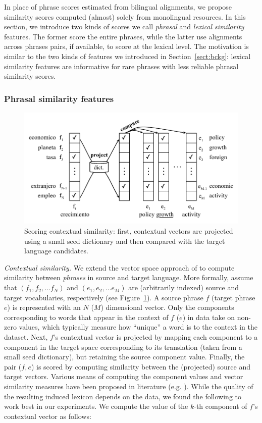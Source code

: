 \documentclass[11pt]{article}
\newcommand{\secref}[1]{Section~\ref{#1}}
\newcommand{\figref}[1]{Figure~\ref{#1}}
\begin{document}
In place of phrase scores estimated from bilingual alignments, we propose similarity scores computed (almost) solely from monolingual resources.  In this section, we introduce two kinds of scores we call {\em phrasal} and {\em lexical similarity} features.  The former score the entire phrases, while the latter use alignments across phrases pairs, if available, to score at the lexical level.  The motivation is similar to the two kinds of features we introduced in \secref{sect:bckg}: lexical similarity features are informative for rare phrases with less reliable phrasal similarity scores.

\subsubsection{Phrasal similarity features} \label{sect:phrasalfeats}

\begin{figure}
\includegraphics[width=\linewidth]{../figures/contextual/contextual}
\caption{Scoring contextual similarity: first, contextual vectors are projected using a small seed dictionary and then compared with the target language candidates.}
\label{fig:contextual}
\end{figure}

\noindent\emph{Contextual similarity.}  We extend the vector space approach of \cite{Rapp:1999} to compute similarity between \emph{phrases} in source and target language.  More formally, assume that $(f_{1}, f_{2}, \dots f_{N})$ and $(e_{1}, e_{2}, \dots e_{M})$ are (arbitrarily indexed) source and target vocabularies, respectively (see \figref{fig:contextual}).  A source phrase $f$ (target phrase $e$) is represented with an $N$ ($M$) dimensional vector.  Only the components corresponding to words that appear in the context of $f$ ($e$) in data take on non-zero values, which typically measure how ``unique'' a word is to the context in the dataset.  Next, $f$'s contextual vector is projected by mapping each component to a component in the target space corresponding to its translation (taken from a small seed dictionary), but retaining the source component value.  Finally, the pair ($f, e$) is scored by computing similarity between the (projected) source and target vectors.  Various means of computing the component values and vector similarity measures have been proposed in literature (e.g. \cite{Rapp:1999,Fung:1998}).  While the quality of the resulting induced lexicon depends on the data, we found the following to work best in our experiments.  We compute the value of the $k$-th component of $f$'s contextual vector  as follows: 
\end{document}
